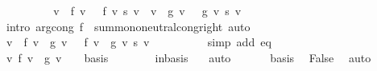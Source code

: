 \begin{isabellebody}
\ \ \ \ \isamarkupfalse%
\ \isamarkupfalse%
\ {\isachardoublequoteopen}{\isachardot}{\kern0pt}{\isachardot}{\kern0pt}{\isachardot}{\kern0pt}\ {\isacharequal}{\kern0pt}\ {\isacharparenleft}{\kern0pt}{\isasymSum}v\ {\isacharbar}{\kern0pt}\ f\ v\ {\isasymnoteq}\ {}{\isachardot}{\kern0pt}\ f\ v\ {\isacharasterisk}{\kern0pt}s\ v{\isacharparenright}{\kern0pt}\ {\isacharminus}{\kern0pt}\ {\isacharparenleft}{\kern0pt}{\isasymSum}v\ {\isacharbar}{\kern0pt}\ g\ v\ {\isasymnoteq}\ {}{\isachardot}{\kern0pt}\ g\ v\ {\isacharasterisk}{\kern0pt}s\ v{\isacharparenright}{\kern0pt}{\isachardoublequoteclose}\isanewline
\ \ \ \ \ \ \isamarkupfalse%
\ {\isacharparenleft}{\kern0pt}intro\ arg{\isacharunderscore}{\kern0pt}cong{}{\isacharbrackleft}{\kern0pt}\ f{\isacharequal}{\kern0pt}\ {\isachardoublequoteopen}{\isacharparenleft}{\kern0pt}{\isacharminus}{\kern0pt}{\isacharparenright}{\kern0pt}{\isachardoublequoteclose}{\isacharbrackright}{\kern0pt}\ sum{\isachardot}{\kern0pt}mono{\isacharunderscore}{\kern0pt}neutral{\isacharunderscore}{\kern0pt}cong{\isacharunderscore}{\kern0pt}right{\isacharparenright}{\kern0pt}\ auto\isanewline
\ \ \ \ \isamarkupfalse%
\ \isamarkupfalse%
\ {\isachardoublequoteopen}{\isacharparenleft}{\kern0pt}{\isasymSum}v\ {\isacharbar}{\kern0pt}\ f\ v\ {\isacharminus}{\kern0pt}\ g\ v\ {\isasymnoteq}\ {}{\isachardot}{\kern0pt}\ {\isacharparenleft}{\kern0pt}f\ v\ {\isacharminus}{\kern0pt}\ g\ v{\isacharparenright}{\kern0pt}\ {\isacharasterisk}{\kern0pt}s\ v{\isacharparenright}{\kern0pt}\ {\isacharequal}{\kern0pt}\ {}{\isachardoublequoteclose}\isanewline
\ \ \ \ \ \ \isamarkupfalse%
\ {\isacharparenleft}{\kern0pt}simp\ add{\isacharcolon}{\kern0pt}\ eq{\isacharparenright}{\kern0pt}\isanewline
\ \ \ \ \isamarkupfalse%
\ {\isachardoublequoteopen}{\isacharbraceleft}{\kern0pt}v{\isachardot}{\kern0pt}\ f\ v\ {\isacharminus}{\kern0pt}\ g\ v\ {\isasymnoteq}\ {}{\isacharbraceright}{\kern0pt}\ {\isasymsubseteq}\ basis{\isachardoublequoteclose}\isanewline
\ \ \ \ \ \ \isamarkupfalse%
\ in{\isacharunderscore}{\kern0pt}basis\ {\isacharasterisk}{\kern0pt}\ \isamarkupfalse%
\ auto\isanewline
\ \ \isamarkupfalse%
\isanewline
\ \ \isamarkupfalse%
\ basis\ \isamarkupfalse%
\ False\ \isamarkupfalse%
\ auto\isanewline
{}\isamarkupfalse%
%
\endisatagproof
{\isafoldproof}%

\end{isabellebody}
